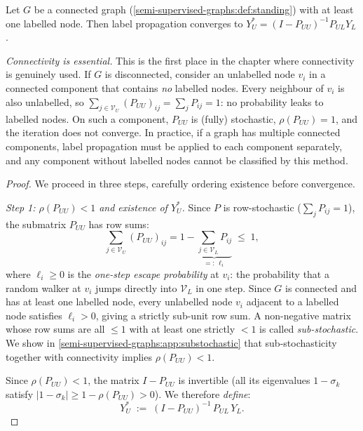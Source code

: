 \begin{notechapter}
\begin{theorem}
\label{semi-supervised-graphs:thm:lp_closed}
Let $G$ be a connected graph (\cref{semi-supervised-graphs:def:standing}) with at
least one labelled node. Then label propagation converges to
$Y_U^* = (I - P_{UU})^{-1}P_{UL}Y_L$.
\end{theorem}

\begin{pitfall}
\emph{Connectivity is essential.} This is the first place in the chapter
where connectivity is genuinely used. If $G$ is disconnected, consider an
unlabelled node $v_i$ in a connected component that contains \emph{no} labelled
nodes. Every neighbour of $v_i$ is also unlabelled, so
$\sum_{j \in \mathcal{V}_U}(P_{UU})_{ij} = \sum_j P_{ij} = 1$: no
probability leaks to labelled nodes. On such a component, $P_{UU}$ is
(fully) stochastic, $\rho(P_{UU}) = 1$, and the iteration does not converge.
In practice, if a graph has multiple connected components, label propagation
must be applied to each component separately, and any component without
labelled nodes cannot be classified by this method.
\end{pitfall}

\begin{proof}
We proceed in three steps, carefully ordering existence before convergence.
\vspace{0.5em}

\emph{Step 1: $\rho(P_{UU}) < 1$ and existence of $Y_U^*$.}
Since $P$ is row-stochastic ($\sum_j P_{ij} = 1$), the submatrix $P_{UU}$ has
row sums:
\[
\sum_{j \in \mathcal{V}_U} (P_{UU})_{ij}
= 1 - \underbrace{\sum_{j \in \mathcal{V}_L} P_{ij}}_{=:\,\ell_i} \;\leq\; 1,
\]
where $\ell_i \geq 0$ is the \emph{one-step escape probability} at $v_i$:
the probability that a random walker at $v_i$ jumps directly into
$\mathcal{V}_L$ in one step. Since $G$ is connected and has at least one
labelled node, every unlabelled node $v_i$ adjacent to a labelled node satisfies
$\ell_i > 0$, giving a strictly sub-unit row sum. A non-negative matrix whose
row sums are all $\leq 1$ with at least one strictly $< 1$ is called
\emph{sub-stochastic}. We show in \cref{semi-supervised-graphs:app:substochastic} that
sub-stochasticity together with connectivity implies $\rho(P_{UU}) < 1$.

Since $\rho(P_{UU}) < 1$, the matrix $I - P_{UU}$ is invertible
(all its eigenvalues $1 - \sigma_k$ satisfy $|1-\sigma_k| \geq 1 - \rho(P_{UU})
> 0$). We therefore \emph{define}:
\[
  Y_U^* \;:=\; (I - P_{UU})^{-1}\,P_{UL}\,Y_L.
\]


\end{proof}
\end{notechapter}
